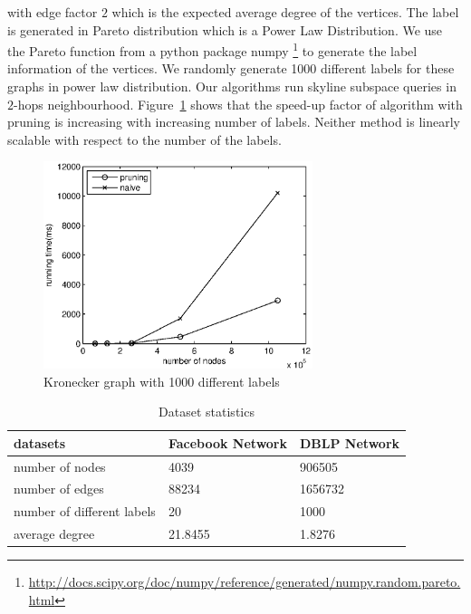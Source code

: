 with edge factor $2$ which is the expected average degree of the vertices. The label is generated in Pareto distribution which is a Power Law Distribution. We use the Pareto function from a python package numpy \footnote{\url{http://docs.scipy.org/doc/numpy/reference/generated/numpy.random.pareto.html}} to generate the label information of the vertices. We randomly generate 1000 different labels for these graphs in power law distribution. Our algorithms run skyline subspace queries in $2$-hops neighbourhood. Figure~\ref{fig:exp:kronecker} shows that the speed-up factor of algorithm with pruning is increasing with increasing number of labels. Neither method is linearly scalable with respect to the number of the labels.

\begin{figure}[h]
    \centering
      \includegraphics[width=0.7\textwidth]{figs/kronecker}
    \caption{Kronecker graph with 1000 different labels}
    \label{fig:exp:kronecker}
\end{figure}

\begin{table}[h]
    \centering
    \begin{tabular}{|l|l|l|}
    \hline
    datasets                   & Facebook Network & DBLP Network \\ \hline
    number of nodes            & 4039             & 906505       \\ \hline
    number of edges            & 88234            & 1656732      \\ \hline
    number of different labels & 20               & 1000         \\ \hline
    average degree             & 21.8455          & 1.8276       \\ \hline
    \end{tabular}
    \label{tab:exp:fb_dblp}
    \caption{Dataset statistics}
\end{table}

